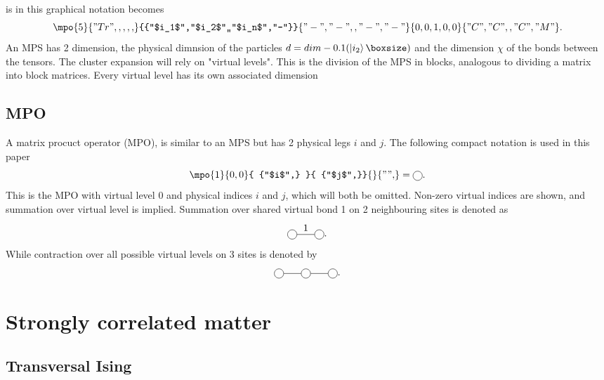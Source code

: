 \documentclass[twocolumn]{article}
\newcounter{a}
\newcounter{b}
\begin{document}
 is in this graphical notation becomes
\begin{equation}\label{eq:general_mps}
    \mpo{5}{{"Tr",,,,,}}{{"$i_1$","$i_2$",,"$i_n$","-"}}{{"-","-",,"-","-"}}{{0,0,1,0,0}}{{"C", "C",,"C","M" }}.
\end{equation}
An MPS has 2 dimension, the physical dimnsion of the particles $d = dim \left( \ket{i_2}  \right)$ and the dimension $\chi$ of the bonds between the tensors. The cluster expansion will rely on "virtual levels". This is the division of the MPS in blocks, analogous to dividing a matrix into block matrices. Every virtual level has its own associated dimension
\subsection{MPO}
A matrix procuct operator (MPO), is similar to an MPS but has 2 physical legs $i$ and $j$. The following compact notation is used in this paper
\begin{equation}
    \mpo{1}{ {0,0}  }{ {"$i$",}  }{ {"$j$",}}{}{{"",}} = \mpob{1}{ {0,0}  }{ {"$i$",}  }{ {"$j$",}}{}{{"",}}.
\end{equation}
This is the MPO with virtual level 0 and physical indices $i$ and $j$, which will both be omitted. Non-zero virtual indices are shown, and summation over virtual level is implied. Summation over shared virtual bond 1 on 2 neighbouring sites is denoted as
\begin{equation}
    \mpob{2}{ {0,1,0}  }{ {"$i_1$","$i_2$"}  }{ {"$j_1$","$j_1$",}}{}{{"",}}.
\end{equation}
While contraction over all possible virtual levels on 3 sites is denoted by
\begin{equation} \label{PEPO_3}
    \mpob{3}{ {0,,,0}  }{}{}{}{{"",,}} .
\end{equation}

\section{Strongly correlated matter}

\subsection{Transversal Ising}
\end{document}
